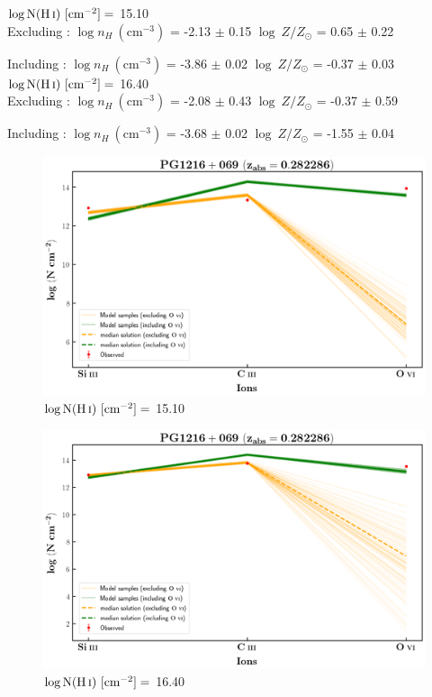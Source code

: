   $\log \text{N}(\ion{H}{i}) \ [\text{cm}^{-2}]=$ 15.10 \\
  
  Excluding  : $\log n_H \ (\text{cm}^{-3})$ = -2.13 $\pm$ 0.15 \hspace{10mm} $\log \ Z/Z_\odot$ = 0.65 $\pm$ 0.22
  
  Including  : $\log n_H \ (\text{cm}^{-3})$ = -3.86 $\pm$ 0.02 \hspace{10mm} $\log \ Z/Z_\odot$ = -0.37 $\pm$ 0.03 \\
  
  $\log \text{N}(\ion{H}{i}) \ [\text{cm}^{-2}]=$ 16.40 \\
  
  Excluding  : $\log n_H \ (\text{cm}^{-3})$ = -2.08 $\pm$ 0.43 \hspace{10mm} $\log \ Z/Z_\odot$ = -0.37 $\pm$ 0.59
  
  Including  : $\log n_H \ (\text{cm}^{-3})$ = -3.68 $\pm$ 0.02 \hspace{10mm} $\log \ Z/Z_\odot$ = -1.55 $\pm$ 0.04 
  \newpage
  
  
  \begin{figure}[!h]
      \centering
      \includegraphics[width=0.9\linewidth]{Ionisation-Modelling-Plots/pg1216-z=0.282286-compI.png}
      \caption{$\log \text{N}(\ion{H}{i}) \ [\text{cm}^{-2}]=$ 15.10}
  \end{figure}
  
  \begin{figure}[!b]
      \centering
      \includegraphics[width=0.9\linewidth]{Ionisation-Modelling-Plots/pg1216-z=0.282286-compII.png}
      \caption{$\log \text{N}(\ion{H}{i}) \ [\text{cm}^{-2}]=$ 16.40}
  \end{figure}
  
